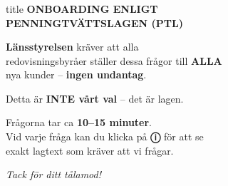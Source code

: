 \documentclass[10pt]{beamer}
\begin{document}
\begin{frame}[label=ptlintro]
  \frametitle{}
  
  \vspace{1cm}
  
  \begin{center}
    \begin{beamercolorbox}[wd=0.9\textwidth,sep=1cm,center,rounded=true,shadow=true]{title}
      {\Large\textbf{ONBOARDING ENLIGT\\PENNINGTVÄTTSLAGEN (PTL)}}
    \end{beamercolorbox}
  \end{center}
  
  \vspace{1cm}
  
  \begin{block}{}
    \large
    \centering
    \textbf{Länsstyrelsen} kräver att alla\\
    redovisningsbyråer ställer dessa frågor till \textbf{ALLA}\\
    nya kunder – \textbf{ingen undantag}.
    
    \vspace{0.5cm}
    
    Detta är \textbf{INTE vårt val} – det är lagen.
    
    \vspace{0.5cm}
    
    Frågorna tar ca \textbf{10–15 minuter}.\\
    Vid varje fråga kan du klicka på \textbf{ⓘ} för att se\\
    exakt lagtext som kräver att vi frågar.
    
    \vspace{0.8cm}
    
    \textit{Tack för ditt tålamod!}
  \end{block}
  
  \vspace{1cm}
  
  \begin{center}
  \end{center}
  
  \vspace{0.3cm}
    

\end{frame}
\end{document}
